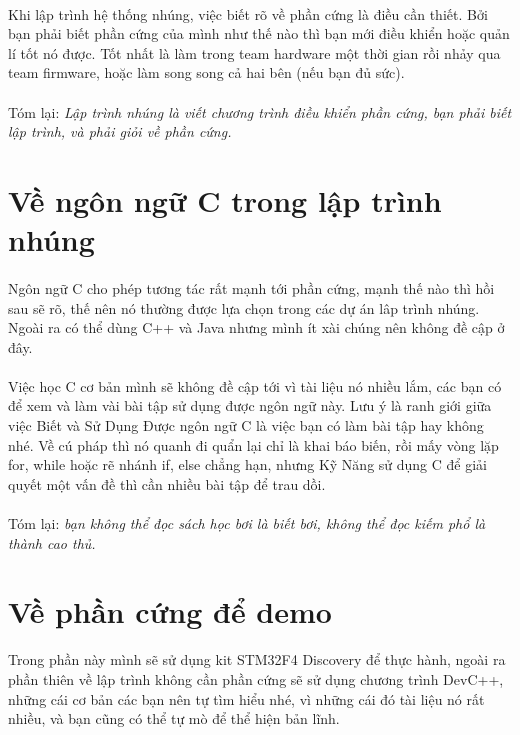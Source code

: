 \documentclass[12pt,a5paper]{book}
\begin{document}
		\paragraph{}
Khi lập trình hệ thống nhúng, việc biết rõ về phần cứng là điều cần thiết. Bởi bạn phải biết phần cứng của mình như thế nào thì bạn mới điều khiển hoặc quản lí tốt nó được. Tốt nhất là làm trong team hardware một thời gian rồi nhảy qua team firmware, hoặc làm song song cả hai bên (nếu bạn đủ sức).
		\paragraph{}
Tóm lại: \textit{Lập trình nhúng là viết chương trình điều khiển phần cứng, bạn phải biết lập trình, và phải giỏi về phần cứng.} 
	\section{Về ngôn ngữ C trong lập trình nhúng}
		\paragraph{}
	Ngôn ngữ C cho phép tương tác rất mạnh tới phần cứng, mạnh thế nào thì hồi sau sẽ rõ, thế nên nó thường được lựa chọn trong các dự án lâp trình nhúng. Ngoài ra có thể dùng C++ và Java nhưng mình ít xài chúng nên không đề cập ở đây.
		\paragraph{}
	Việc học C cơ bản mình sẽ không đề cập tới vì tài liệu nó nhiều lắm, các bạn có để xem và làm vài bài tập sử dụng được ngôn ngữ này. Lưu ý là ranh giới giữa việc Biết và Sử Dụng Được ngôn ngữ C là việc bạn có làm bài tập hay không nhé. Về cú pháp thì nó quanh đi quẩn lại chỉ là khai báo biến, rồi mấy vòng lặp for, while hoặc rẽ nhánh if, else chẳng hạn, nhưng Kỹ Năng sử dụng C để giải quyết một vấn đề thì cần nhiều bài tập để trau dồi.
		\paragraph{}
	Tóm lại: \textit{bạn không thể đọc sách học bơi là biết bơi, không thể đọc kiếm phổ là thành cao thủ.}
	\section{Về phần cứng để demo}
	Trong phần này mình sẽ sử dụng kit STM32F4 Discovery để thực hành, ngoài ra phần thiên về lập trình không cần phần cứng sẽ sử dụng chương trình DevC++, những cái cơ bản các bạn nên tự tìm hiểu nhé, vì những cái đó tài liệu nó rất nhiều, và bạn cũng có thể tự mò để thể hiện bản lĩnh.
\end{document}
